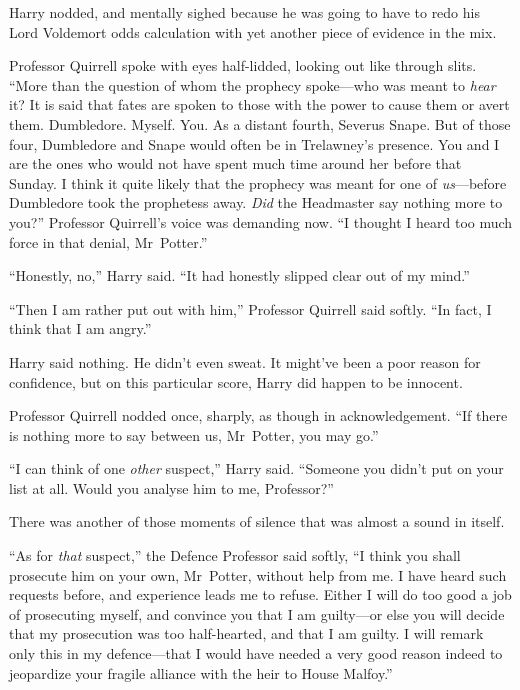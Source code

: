 Harry nodded, and mentally sighed because he was going to have to redo his Lord Voldemort odds calculation with yet another piece of evidence in the mix.

Professor Quirrell spoke with eyes half-lidded, looking out like through slits. “More than the question of whom the prophecy spoke—who was meant to \emph{hear} it? It is said that fates are spoken to those with the power to cause them or avert them. Dumbledore. Myself. You. As a distant fourth, Severus Snape. But of those four, Dumbledore and Snape would often be in Trelawney’s presence. You and I are the ones who would not have spent much time around her before that Sunday. I think it quite likely that the prophecy was meant for one of \emph{us}—before Dumbledore took the prophetess away. \emph{Did} the Headmaster say nothing more to you?” Professor Quirrell’s voice was demanding now. “I thought I heard too much force in that denial, Mr~Potter.”

“Honestly, no,” Harry said. “It had honestly slipped clear out of my mind.”

“Then I am rather put out with him,” Professor Quirrell said softly. “In fact, I think that I am angry.”

Harry said nothing. He didn’t even sweat. It might’ve been a poor reason for confidence, but on this particular score, Harry did happen to be innocent.

Professor Quirrell nodded once, sharply, as though in acknowledgement. “If there is nothing more to say between us, Mr~Potter, you may go.”

“I can think of one \emph{other} suspect,” Harry said. “Someone you didn’t put on your list at all. Would you analyse him to me, Professor?”

There was another of those moments of silence that was almost a sound in itself.

“As for \emph{that} suspect,” the Defence Professor said softly, “I think you shall prosecute him on your own, Mr~Potter, without help from me. I have heard such requests before, and experience leads me to refuse. Either I will do too good a job of prosecuting myself, and convince you that I am guilty—or else you will decide that my prosecution was too half-hearted, and that I am guilty. I will remark only this in my defence—that I would have needed a very good reason indeed to jeopardize your fragile alliance with the heir to House Malfoy.”


